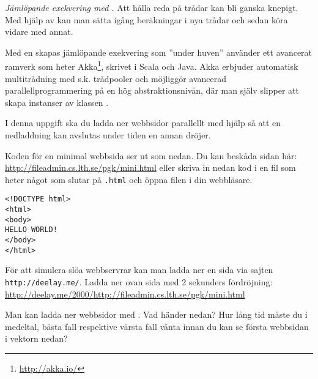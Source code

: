 \Task \emph{Jämlöpande exekvering med .} Att hålla reda på trådar kan bli ganska knepigt. Med hjälp av  kan man sätta igång beräkningar i nya trådar och sedan köra vidare med annat. 

\begin{Background}
Med en  skapas jämlöpande exekvering som ''under huven'' använder ett avancerat ramverk som heter Akka\footnote{\url{http://akka.io/}}, skrivet i Scala och Java. Akka erbjuder automatisk  multitrådning med s.k. trådpooler och möjliggör avancerad parallellprogrammering på en hög  abstraktionsnivån, där man själv slipper att skapa instanser av klassen . 
\end{Background}

I denna uppgift ska du ladda ner webbsidor parallellt med hjälp  så att en nedladdning kan avslutas under tiden en annan dröjer.  

\Subtask Koden för en minimal webbsida ser ut som nedan. Du kan beskåda sidan här: \url{http://fileadmin.cs.lth.se/pgk/mini.html} eller skriva in nedan kod i en fil som heter något som slutar på \texttt{.html} och öppna filen i din webbläsare.

\begin{verbatim}
<!DOCTYPE html>
<html>
<body>
HELLO WORLD!
</body>
</html>
\end{verbatim}

\Subtask För att simulera slöa webbservrar kan man ladda ner en sida via sajten \texttt{http://deelay.me/}. Ladda ner ovan sida med 2 sekunders fördröjning:\\
\url{http://deelay.me/2000/http://fileadmin.cs.lth.se/pgk/mini.html}

\Subtask Man kan ladda ner webbsidor med . Vad händer nedan? Hur lång tid måste du i medeltal, bästa fall respektive värsta fall vänta innan du kan se första webbsidan i vektorn  nedan?


